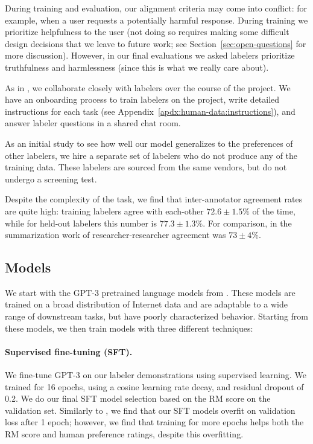 During training and evaluation, our alignment criteria may come into conflict: for example, when a user requests a potentially harmful response. During training we prioritize helpfulness to the user (not doing so requires making some difficult design decisions that we leave to future work; see Section~\ref{sec:open-questions} for more discussion). However, in our final evaluations we asked labelers prioritize truthfulness and harmlessness (since this is what we really care about). 

As in \citet{stiennon2020learning}, we collaborate closely with labelers over the course of the project. We have an onboarding process to train labelers on the project, write detailed instructions for each task (see Appendix~\ref{apdx:human-data:instructions}), and answer labeler questions in a shared chat room.

As an initial study to see how well our model generalizes to the preferences of other labelers, we hire a separate set of labelers who do not produce any of the training data. These labelers are sourced from the same vendors, but do not undergo a screening test. 

Despite the complexity of the task, we find that inter-annotator agreement rates are quite high: training labelers agree with each-other $72.6 \pm 1.5\%$ of the time, while for held-out labelers this number is $77.3 \pm 1.3\%$. For comparison, in the summarization work of \citet{stiennon2020learning} researcher-researcher agreement was $73 \pm 4\%$.

\subsection{Models}
\label{sec:models}

We start with the GPT-3 pretrained language models from \citet{brown2020language}. These models are trained on a broad distribution of Internet data and are adaptable to a wide range of downstream tasks, but have poorly characterized behavior. Starting from these models, we then train models with three different techniques:

\paragraph{Supervised fine-tuning (SFT).} We fine-tune GPT-3 on our labeler demonstrations using supervised learning.  We trained for 16 epochs, using a cosine learning rate decay, and residual dropout of 0.2. We do our final SFT model selection based on the RM score on the validation set. Similarly to \citet{wu2021recursively}, we find that our SFT models overfit on validation loss after 1 epoch; however, we find that training for more epochs helps both the RM score and human preference ratings, despite this overfitting.


